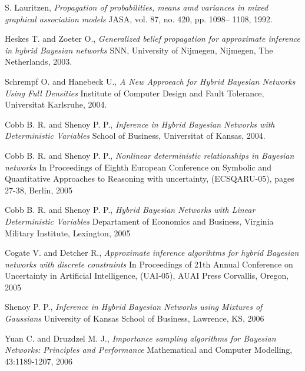 \documentclass[a4paper,11pt]{article}
\begin{document}

\begin{thebibliography}{}

S. Lauritzen, \textit{Propagation of probabilities, means amd variances in mixed graphical association models} JASA, vol. 87, no. 420, pp. 1098– 1108, 1992.

Heskes T. and Zoeter O., \textit{Generalized belief propagation for approximate inference in hybrid Bayesian networks} SNN, University of Nijmegen, Nijmegen, The Netherlands, 2003.

Schrempf O. and Hanebeck U., \textit{A New Approeach for Hybrid Bayesian Networks Using Full Densities} Institute of Computer Design and Fault Tolerance, Universitat Karlsruhe, 2004.

Cobb B. R. and Shenoy P. P., \textit{Inference in Hybrid Bayesian Networks with Deterministic Variables} School of Business, Universitat of Kansas, 2004.

Cobb B. R. and Shenoy P. P., \textit{Nonlinear deterministic relationships in Bayesian networks} In Proceedings of Eighth European Conference on Symbolic and Quantitative Approaches to Reasoning with uncertainty, (ECSQARU-05), pages 27-38, Berlin, 2005

Cobb B. R. and Shenoy P. P., \textit{Hybrid Bayesian Networks with Linear Deterministic Variables} Departament of Economics and Business, Virginia Military Institute, Lexington, 2005

Cogate V. and Detcher R., \textit{Approximate inference algorihtms for hybrid Bayesian networks with discrete constraints} In Proceedings of 21th Annual Conference on Uncertainty in Artificial Intelligence, (UAI-05), AUAI Press Corvallis, Oregon, 2005

Shenoy P. P., \textit{Inference in Hybrid Bayesian Networks using Mixtures of Gaussians} University of Kansas School of Business, Lawrence, KS, 2006

Yuan C. and Druzdzel M. J., \textit{Importance sampling algorithms for Bayesian Networks: Principles and Performance} Mathematical and Computer Modelling, 43:1189-1207, 2006


\end{thebibliography}
\end{document}
